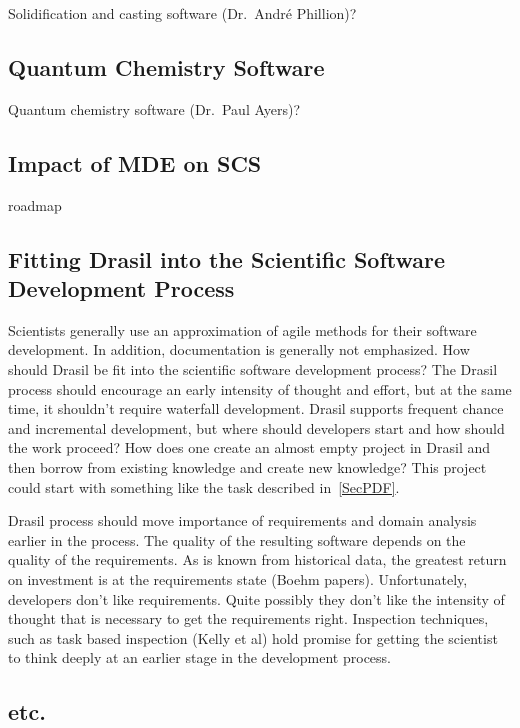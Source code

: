 \documentclass[12pt]{article}
\begin{document}
Solidification and casting software (Dr.\ Andr\'e Phillion)?

\subsection{Quantum Chemistry Software}

Quantum chemistry software (Dr.\ Paul Ayers)?

\subsection{Impact of MDE on SCS}

roadmap

\subsection{Fitting Drasil into the Scientific Software Development Process}

Scientists generally use an approximation of agile methods for their software
development.  In addition, documentation is generally not emphasized.  How
should Drasil be fit into the scientific software development process?  The
Drasil process should encourage an early intensity of thought and effort, but at
the same time, it shouldn't require waterfall development.  Drasil supports
frequent chance and incremental development, but where should developers start
and how should the work proceed?  How does one create an almost empty project in
Drasil and then borrow from existing knowledge and create new knowledge?  This
project could start with something like the task described in~\ref{SecPDF}.

Drasil process should move importance of requirements and domain analysis
earlier in the process.  The quality of the resulting software depends on the
quality of the requirements.  As is known from historical data, the greatest
return on investment is at the requirements state (Boehm papers).
Unfortunately, developers don't like requirements.  Quite possibly they don't
like the intensity of thought that is necessary to get the requirements right.
Inspection techniques, such as task based inspection (Kelly et al) hold promise
for getting the scientist to think deeply at an earlier stage in the development
process.

\subsection{etc.}
\end{document}
